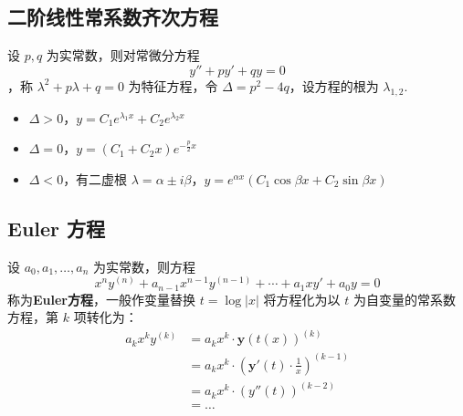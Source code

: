 \documentclass[./main.tex]{subfiles}
\begin{document}
\subsection{二阶线性常系数齐次方程}
设 $p,q$ 为实常数，则对常微分方程 $$y''+py'+qy=0$$，称 $\lambda^2+p\lambda+q=0$ 为特征方程，令 $\Delta=p^2-4q$，设方程的根为 $\lambda_{1,2}$.
\begin{itemize}
  \item $\Delta>0$，$y=C_1e^{\lambda_1x}+C_2e^{\lambda_2x}$
  \item $\Delta=0$，$y=(C_1+C_2x)e^{-\frac{p}{2}x}$
  \item $\Delta<0$，有二虚根 $\lambda=\alpha\pm i\beta$，$y=e^{\alpha x}(C_1\cos{\beta x}+C_2\sin\beta x)$
\end{itemize}
\subsection{Euler 方程}
设 $a_0,a_1,\dots,a_n$ 为实常数，则方程
$$x^ny^{(n)}+a_{n-1}x^{n-1}y^{(n-1)}+\cdots+a_1xy'+a_0y=0$$
称为\textbf{Euler方程}，一般作变量替换 $t=\log|x|$ 将方程化为以 $t$ 为自变量的常系数方程，第 $k$ 项转化为：
\begin{align*}
  a_kx^ky^{(k)}&=a_kx^{k}\cdot\bm{y}(t(x))^{(k)}\\
  &=a_kx^{k}\cdot (\bm{y}'(t)\cdot\frac{1}{x})^{(k-1)}\\
  &=a_kx^{k}\cdot(y''(t))^{(k-2)}\\
  &=\dots
\end{align*}
\end{document}
